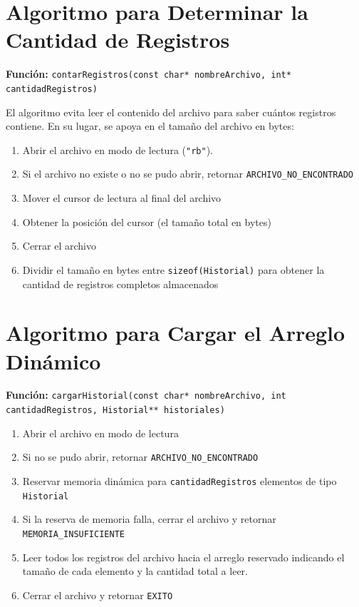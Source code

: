 \documentclass[12pt,letterpaper]{article}
\begin{document}
\section{Algoritmo para Determinar la Cantidad de Registros}
\textbf{Función:} \texttt{contarRegistros(const char* nombreArchivo, int* cantidadRegistros)}

El algoritmo evita leer el contenido del archivo para saber cuántos registros contiene. 
En su lugar, se apoya en el tamaño del archivo en bytes:

\begin{enumerate}
    \item Abrir el archivo en modo de lectura (\texttt{"rb"}).
    \item Si el archivo no existe o no se pudo abrir, retornar \texttt{ARCHIVO\_NO\_ENCONTRADO}
    \item Mover el cursor de lectura al final del archivo
    \item Obtener la posición del cursor (el tamaño total en bytes)
    \item Cerrar el archivo
    \item Dividir el tamaño en bytes entre \texttt{sizeof(Historial)} para obtener la cantidad de registros completos almacenados
\end{enumerate}

\section{Algoritmo para Cargar el Arreglo Dinámico}
\textbf{Función:} \texttt{cargarHistorial(const char* nombreArchivo, int cantidadRegistros, Historial** historiales)}

\begin{enumerate}
    \item Abrir el archivo en modo de lectura
    \item Si no se pudo abrir, retornar \texttt{ARCHIVO\_NO\_ENCONTRADO}
    \item Reservar memoria dinámica para \texttt{cantidadRegistros} elementos de tipo \texttt{Historial}
    \item Si la reserva de memoria falla, cerrar el archivo y retornar \texttt{MEMORIA\_INSUFICIENTE}
    \item Leer todos los registros del archivo hacia el arreglo reservado indicando el tamaño de cada elemento y la cantidad total a leer.
    \item Cerrar el archivo y retornar \texttt{EXITO}
\end{enumerate}
\end{document}
